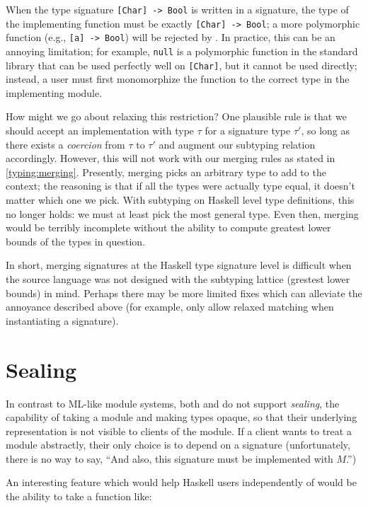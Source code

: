 When the type signature \verb|[Char] -> Bool| is written in a signature,
the type of the implementing function must be exactly \verb|[Char] -> Bool|;
a more polymorphic function (e.g., \verb|[a] -> Bool|) will be rejected
by \Backpack{}.
In practice, this can be an annoying limitation; for example, \verb|null|
is a polymorphic function in the standard library that can be used
perfectly well on \verb|[Char]|, but it cannot be used directly; instead,
a user must first monomorphize the function to the correct type in the
implementing module.

How might we go about relaxing this restriction?  One plausible rule is
that we should accept an implementation with type $\tau$ for a signature
type $\tau'$, so long as there exists a \emph{coercion} from $\tau$ to
$\tau'$ and augment our subtyping relation accordingly.  However, this will
not work with our merging rules as stated in \cref{typing:merging}.
Presently, merging picks an arbitrary type to add to the context; the reasoning
is that if all the types were actually type equal, it doesn't matter which
one we pick.  With subtyping on Haskell level type definitions, this no
longer holds: we must at least pick the most general type.  Even then,
merging would be terribly incomplete without the ability to compute
greatest lower bounds of the types in question.

In short, merging signatures at the Haskell type signature level is difficult
when the source language was not designed with the subtyping lattice (grestest
lower bounds) in mind.  Perhaps there may be more limited fixes which can
alleviate the annoyance described above (for example, only allow relaxed
matching when instantiating a signature).

\label{sec:sealing}
\section{Sealing}

In contrast to ML-like module systems, both \Backpack{} and \OldBackpack{} do not
support \emph{sealing}, the capability of taking a module and making
types opaque, so that their underlying representation is not visible
to clients of the module.  If a client wants to treat a module abstractly,
their only choice is to depend on a signature (unfortunately, there is no
way to say, ``And also, this signature must be implemented with $M$.'')

An interesting feature which would help Haskell users independently of
\Backpack{} would be the ability to take a function like:

